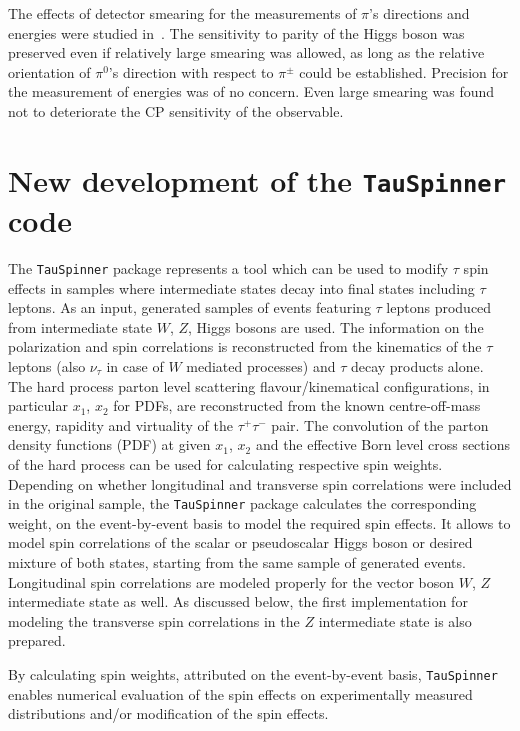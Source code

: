 \documentclass[12pt]{article}
\begin{document}
The effects of detector smearing for the measurements of $\pi$'s directions
and energies were studied in~\cite{Bower:2002zx}. The sensitivity to parity of the Higgs boson was preserved
even if relatively large smearing was allowed, as long as the relative orientation
of  $\pi^0$'s direction with respect to $ \pi^\pm$ could be established.
Precision for the measurement of energies was of no concern. Even large smearing
was found not to deteriorate the CP sensitivity of the observable. 


\section {New development of the {\tt TauSpinner} code}
\label{sec:Newdevelopment}

The {\tt TauSpinner} package  \cite{Czyczula:2012ny,Banerjee:2012ez, TauSpinner2014} represents 
a tool which can be used to modify $\tau$ spin effects in samples where intermediate states
decay into final states including  $\tau$ leptons. 
As an input, generated samples of events featuring $\tau$ leptons produced from intermediate state 
$W$, $Z$, Higgs bosons are used. 
The information on the polarization and spin correlations is reconstructed from the kinematics of the 
$\tau$ leptons (also $\nu_\tau$ in case of $W$ mediated processes) and $\tau$ decay products alone. 
The hard process parton level scattering flavour/kinematical configurations, in particular $x_1$, $x_2$ for PDFs, are reconstructed
from the known centre-off-mass energy,  rapidity and virtuality of the $\tau^+\tau^-$ pair. The convolution of the 
parton density functions (PDF) at given $x_1$, $x_2$ and the effective Born level cross sections of the hard process
can be used for  calculating respective spin weights. Depending on whether
longitudinal and transverse spin correlations were included  in the original sample, the {\tt TauSpinner} package calculates
the corresponding  weight, on the event-by-event basis to model the required spin effects. 
It allows to model spin correlations of the scalar
or pseudoscalar Higgs boson or desired mixture of both states, starting from the same sample of generated events. 
Longitudinal spin correlations are 
modeled properly for the vector boson  $W$, $Z$ intermediate state as well. As discussed below, the first 
implementation  for modeling the transverse spin correlations in the $Z$ intermediate state
is also prepared.

By calculating spin weights, attributed on the event-by-event basis, {\tt TauSpinner} enables numerical evaluation of 
the spin effects on experimentally measured distributions and/or modification of the spin effects.
\end{document}
